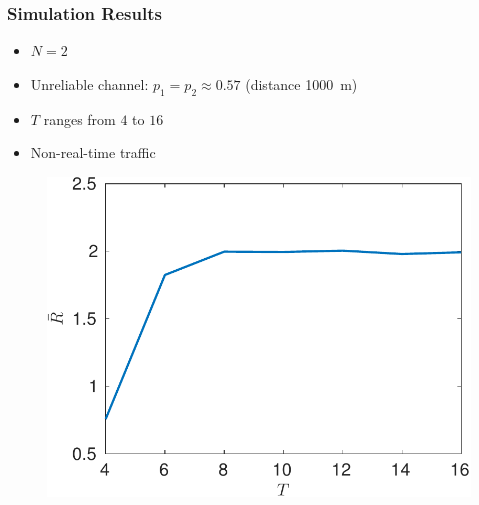 \documentclass{beamer}
\begin{document}
\begin{frame}
\frametitle{Simulation Results}
\begin{itemize}
\item $N=2$
\item Unreliable channel: $p_1 = p_2 \approx 0.57$ (distance \SI{1000}{m})
\item $T$ ranges from $4$ to $16$
\item Non-real-time traffic
\end{itemize}
\begin{figure}[htbp]
  \centering
  \includegraphics[height=.5\textheight]{nonrealtime_throughput_T.pdf}
\end{figure}
\end{frame}
\end{document}
